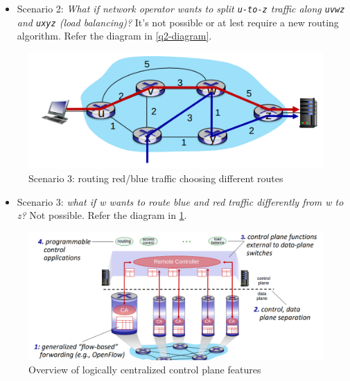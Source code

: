 \documentclass[10pt,a4paper]{report}
\theoremstyle{definition}
\begin{document}
\begin{itemize}
	\item Scenario 2: \textit{What if network operator wants to split \texttt{u-to-z} traffic along \texttt{uvwz} and \texttt{uxyz} (load balancing)?} It's not possible or at lest require a new routing algorithm. Refer the diagram in \ref{q2-diagram}.
\end{itemize}

\begin{figure}[h]
	\centering\includegraphics[scale=0.50]{images/Pasted image 20230322110235.png}
	\caption{Scenario 3: routing red/blue traffic choosing different routes}
	\label{q3-diagram}
\end{figure}

\begin{itemize}
	\item Scenario 3: \textit{what if w wants to route blue and red traffic differently from w to z?} Not possible. Refer the diagram in \ref{q3-diagram}. 
\end{itemize}

\begin{figure}
	\centering\includegraphics[scale=0.30]{images/Pasted image 20230322110317.png}
	\caption{Overview of logically centralized control plane features}
\end{figure}
\end{document}
